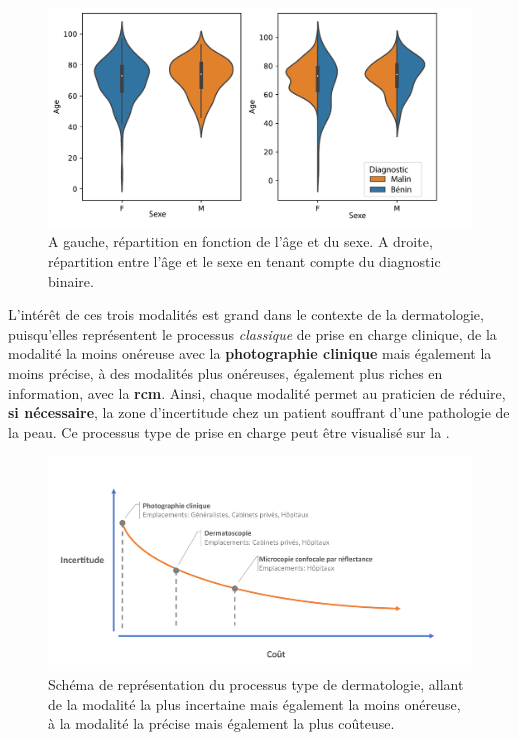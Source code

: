 \begin{figure}[H]
    \centering
    \includegraphics[width=\linewidth]{contents/chapter_4/resources/statistics_age_sex.pdf}
    \caption{A gauche, répartition en fonction de l'âge et du sexe. A droite, répartition entre l'âge et le sexe en tenant compte du diagnostic binaire.}
    \label{fig:statistics_age_sex}
\end{figure}\par

L'intérêt de ces trois modalités est grand dans le contexte de la dermatologie, puisqu'elles représentent le processus \textit{classique} de prise en charge clinique, de la modalité la moins onéreuse avec la \textbf{photographie clinique} mais également la moins précise, à des modalités plus onéreuses, également plus riches en information, avec la \textbf{\gls{rcm}}. Ainsi, chaque modalité permet au praticien de réduire, \textbf{si nécessaire}, la zone d'incertitude chez un patient souffrant d'une pathologie de la peau. Ce processus type de prise en charge peut être visualisé sur la .\par

\begin{figure}[H]
    \centering
    \includegraphics[width=\linewidth]{contents/chapter_4/resources/scheme_devices_location.pdf}
    \caption{Schéma de représentation du processus type de dermatologie, allant de la modalité la plus incertaine mais également la moins onéreuse, à la modalité la précise mais également la plus coûteuse.}
    \label{fig:scheme_devices_location}
\end{figure}\par

